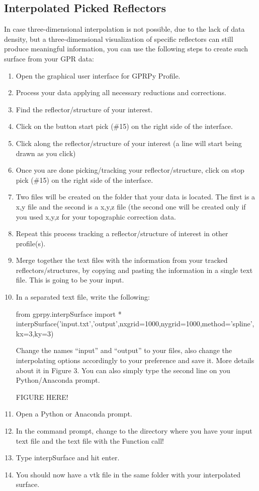 \documentclass[12pt]{article}
\begin{document}
	\subsection{Interpolated Picked Reflectors}
	
	In case three-dimensional interpolation is not possible, due to the lack of data density, but a three-dimensional visualization of specific reflectors can still produce meaningful information, you can use the following steps to create such surface from your GPR data:

\begin{enumerate}
\item Open the graphical user interface for GPRPy Profile.
\item Process your data applying all necessary reductions and corrections. 
\item Find the reflector/structure of your interest. 
\item Click on the button start pick (\#15) on the right side of the interface. \item	Click along the reflector/structure of your interest (a line will start being drawn as you click)
\item Once you are done picking/tracking your reflector/structure, click on stop pick (\#15) on the right side of the interface. 
\item Two files will be created on the folder that your data is located. The first is a x,y file and the second is a x,y,z file (the second one will be created only if you used x,y,z for your topographic correction data.
\item Repeat this process tracking a reflector/structure of interest in other profile(s).
\item Merge together the text files with the information from your tracked reflectors/structures, by copying and pasting the information in a single text file. This is going to be your input.
\item In a separated text file, write the following:

from gprpy.interpSurface import *
interpSurface('input.txt','output',nxgrid=1000,nygrid=1000,method='spline',kx=3,ky=3) 

Change the names “input” and “output” to your files, also change the interpolating options accordingly to your preference and save it. More details about it in Figure 3. You can also simply type the second line on you Python/Anaconda prompt.

												FIGURE HERE!
												
\item Open a Python or Anaconda prompt.
\item In the command prompt, change to the directory where you have your input text file and the text file with the Function call! 
\item Type interpSurface and hit enter.
\item You should now have a vtk file in the same folder with your interpolated surface.
	
\end{enumerate}
	
\end{document}
